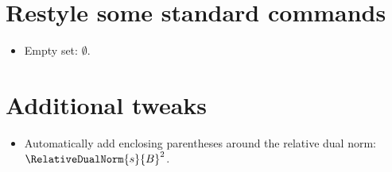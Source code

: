 \documentclass{article}
\begin{document}
  \section{Restyle some standard commands}

  \begin{itemize}
    \item Empty set: $\emptyset$.
  \end{itemize}

  \section{Additional tweaks}

  \begin{itemize}
    \item Automatically add enclosing parentheses around the relative dual norm: $\RelativeDualNorm{s}{B}^2$.
  \end{itemize}
\end{document}
